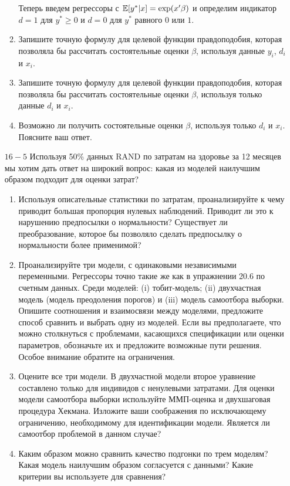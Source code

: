 \begin{enumerate}
\begin{enumerate}
Теперь введем регрессоры с $\mathbb{E}[y^*|x]=\exp(x'\beta)$ и определим индикатор $d=1$ для $y^*\geq 0 $ и $d=0$ для $y^*$ равного $0$ или $1$.

\item  Запишите точную формулу для целевой функции правдоподобия, которая позволяла бы рассчитать состоятельные оценки $\beta$, используя данные $y_i$, $d_i$ и $x_i$.


\item  Запишите точную формулу для целевой функции правдоподобия, которая позволяла бы рассчитать состоятельные оценки $\beta$, используя только данные $d_i$ и $x_i$.

\item  Возможно ли получить состоятельные оценки $\beta$, используя только $d_i$ и $x_i$. Поясните ваш ответ.
\end{enumerate}
\item [$16 - 5$]
Используя 50\% данных RAND по затратам на здоровье за 12 месяцев мы хотим дать ответ на широкий вопрос: какая из моделей наилучшим образом подходит для оценки затрат? 
\begin{enumerate}
\item 	Используя описательные статистики по  затратам, проанализируйте к чему приводит большая пропорция нулевых наблюдений. Приводит ли это к нарушению предпосылки о нормальности? Существует ли преобразование, которое бы позволяло сделать предпосылку о нормальности более применимой?
\item 	Проанализируйте три модели, с одинаковыми независимыми переменными. Регрессоры точно такие же как в  упражнении 20.6 по счетным данных. Среди моделей: (i) тобит-модель; (ii) двухчастная модель (модель преодоления порогов) и (iii) модель самоотбора выборки. Опишите соотношения и взаимосвязи между моделями, предложите способ сравнить и выбрать одну из моделей. Если вы предполагаете, что можно столкнуться с проблемами, касающихся спецификации или оценки параметров, обозначьте их и предложите возможные пути решения. Особое внимание обратите на ограничения.
\item 	Оцените все три модели. В двухчастной модели второе уравнение составлено только для индивидов с ненулевыми затратами. Для оценки модели самоотбора выборки используйте ММП-оценка и двухшаговая процедура Хекмана. Изложите ваши соображения по исключающему ограничению, необходимому для идентификации модели. Является ли самоотбор проблемой в данном случае?
\item Каким образом можно сравнить качество подгонки по трем моделям? Какая модель наилучшим образом согласуется с данными? Какие критерии вы используете для сравнения?

\end{enumerate}
\end{enumerate}
